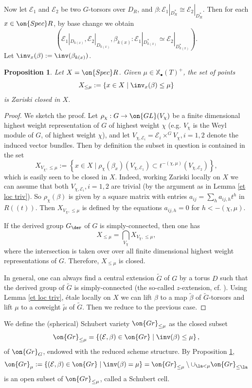 \documentclass[]{pcmi}
\theoremstyle{plain}
\newtheorem{prop}[equation]{Proposition}
\theoremstyle{remark}
\theoremstyle{definition}
\newcommand{\mE}{{\mathcal E}}
\newcommand{\Gr}{{\on{Gr}}}
\newcommand{\Spec}{\on{Spec}}
\newcommand{\GL}{{\on{GL}}}
\def\xcoch{\mathbb{X}_\bullet}
\begin{document}
Now let $\mE_1$ and $\mE_2$ be two $G$-torsors over $D_R$, and 
$\beta: \mE_1|_{D_R^*}\cong \mE_2|_{D_R^*}$.
Then for each $x\in \Spec R$, by base change we obtain 
$$(\mE_1|_{D_{k(x)}},\mE_2|_{D_{k(x)}},\beta_{k(x)}: \mE_1|_{D_{k(x)}^*}\simeq \mE_2|_{D_{k(x)}^*}).$$ Let $\inv_x(\beta):=\inv(\beta_{k(x)})$.


\begin{prop}\label{HP}
Let $X=\Spec R$. Given $\mu\in\xcoch(T)^+$,
the set of points 
$$X_{\leq \mu}:=\left\{x\in X\mid \inv_x(\beta)\leq \mu\right\}$$
is Zariski closed in $X$.
\end{prop}
\begin{proof}We sketch the proof. Let $\rho_\chi: G\to \GL(V_\chi)$ be a finite dimensional highest weight representation of $G$ of highest weight $\chi$ (e.g. $V_\chi$ is the Weyl module of $G$, of highest weight $\chi$), and let $V_{\chi,\mE_i}=\mE_i\times^GV_{\chi}, i=1,2$ denote the induced vector bundles. Then by definition the subset in question is contained in the set 
$$X_{V_\chi,\leq \mu}:=\left\{x\in X\mid\rho_\chi(\beta_x)(V_{\chi,\mE_1})\subset t^{-(\chi,\mu)}(V_{\chi,\mE_2})\right\},$$
which is easily seen to be closed in $X$. Indeed, working Zariski locally on $X$ we can assume that both $V_{\chi,\mE_i}, i=1,2$ are trivial (by the argument as in Lemma \ref{et loc triv}). So $\rho_\chi(\beta)$ is given by a square matrix  with entries $a_{ij}=\sum_h a_{ij,h}t^h$  in $R((t))$. Then $X_{V_\chi,\leq \mu}$ is defined by the equations $a_{ij,h}=0$ for $h<-(\chi,\mu)$.


If the derived group $G_\der$ of $G$ is simply-connected, then one has
$$X_{\leq \mu}=\bigcap_{V_\chi} X_{V_\chi,\leq \mu},$$ where the intersection is taken over over all finite dimensional highest weight representations of $G$. Therefore, $X_{\leq \mu}$ is closed.

In general, one can always find a central extension $\tilde G$ of $G$ by a torus $D$ such that the derived group of $\tilde G$ is simply-connected (the so-called $z$-extension, cf. \cite[Proposition 3.1]{MS}). Using Lemma \ref{et loc triv}, \'etale locally on $X$ we can lift $\beta$ to a map $\tilde \beta$ of $\tilde G$-torsors and lift $\mu$ to a coweight $\tilde \mu$ of $\tilde G$. Then we reduce to the previous case.
\end{proof}

We define the (spherical) Schubert variety $\Gr_{\leq \mu}$ as the closed subset
$$\Gr_{\leq \mu}=\left\{(\mE,\beta)\in \Gr\mid \inv(\beta)\leq \mu\right\},$$
of $\Gr_G$, endowed with the reduced scheme structure. By Proposition \ref{HP}, 
\[\Gr_\mu:=\left\{(\mE,\beta)\in \Gr\mid \inv(\beta)=\mu\right\}=\Gr_{\leq \mu}\setminus \cup_{\la<\mu}\Gr_{\leq \la}\]
is an open subset of $\Gr_{\leq \mu}$, called a Schubert cell. 
\end{document}
